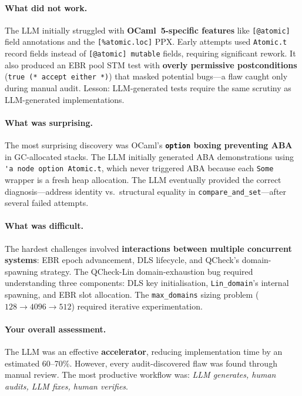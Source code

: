 \documentclass[11pt,a4paper]{article}
\begin{document}
\paragraph{What did not work.}
The LLM initially struggled with \textbf{OCaml~5-specific features} like
\texttt{[@atomic]} field annotations and the \texttt{[\%atomic.loc]} PPX.
Early attempts used \texttt{Atomic.t} record fields instead of
\texttt{[@atomic] mutable} fields, requiring significant rework.  It also
produced an EBR pool STM test with \textbf{overly permissive postconditions}
(\lstinline{true (* accept either *)}) that masked potential bugs---a flaw
caught only during manual audit.  Lesson: LLM-generated tests require the same
scrutiny as LLM-generated implementations.

\paragraph{What was surprising.}
The most surprising discovery was OCaml's \textbf{\texttt{option} boxing
preventing ABA} in GC-allocated stacks.  The LLM initially generated ABA
demonstrations using \lstinline{'a node option Atomic.t}, which never
triggered ABA because each \lstinline{Some} wrapper is a fresh heap allocation.
The LLM eventually provided the correct diagnosis---address identity
vs.\ structural equality in \lstinline{compare_and_set}---after several failed
attempts.

\paragraph{What was difficult.}
The hardest challenges involved \textbf{interactions between multiple concurrent
systems}: EBR epoch advancement, DLS lifecycle, and QCheck's domain-spawning
strategy.  The QCheck-Lin domain-exhaustion bug required understanding three
components: DLS key initialisation, \texttt{Lin\_domain}'s internal spawning,
and EBR slot allocation.  The \texttt{max\_domains} sizing problem
($128 \to 4096 \to 512$) required iterative experimentation.

\paragraph{Your overall assessment.}
The LLM was an effective \textbf{accelerator}, reducing implementation time by
an estimated 60--70\%.  However, every audit-discovered flaw was found through
manual review.  The most productive workflow was:
\emph{LLM generates, human audits, LLM fixes, human verifies}.
\end{document}
